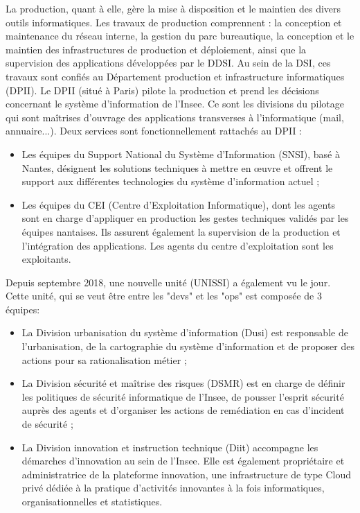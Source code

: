 \documentclass[11pt,fleqn]{book} %
\begin{document}
La production, quant à elle, gère la mise à disposition et le maintien des divers outils informatiques. Les travaux de production comprennent : la conception et maintenance du réseau interne, la gestion du parc bureautique, la conception et le maintien des infrastructures de production et déploiement, ainsi que la supervision des applications développées par le DDSI. Au sein de la DSI, ces travaux sont confiés au Département production et infrastructure informatiques (DPII). Le DPII (situé à Paris) pilote la production et prend les décisions concernant le système d’information de l’Insee. Ce sont les divisions du pilotage qui sont maîtrises d’ouvrage des applications transverses à l’informatique (mail, annuaire...). Deux services sont fonctionnellement rattachés au DPII :
\begin{itemize}
    \item Les équipes du Support National du Système d’Information (SNSI), basé à Nantes, désignent les solutions techniques à mettre en œuvre et offrent le support aux différentes technologies du système d’information actuel ;
    \item Les équipes du CEI (Centre d’Exploitation Informatique), dont les agents sont en charge d’appliquer
en production les gestes techniques validés par les équipes nantaises. Ils assurent également la supervision de la production et l’intégration des applications. Les agents du centre
d’exploitation sont les exploitants.\\
\end{itemize}

Depuis septembre 2018, une nouvelle unité (UNISSI) a également vu le jour. Cette unité, qui se veut être entre les "devs" et les "ops" est composée de 3 équipes: 
\begin{itemize}
    \item La Division urbanisation du système d’information (Dusi) est responsable de l’urbanisation, de la cartographie du système d’information et de proposer des actions pour sa rationalisation métier ;
    \item La Division sécurité et maîtrise des risques (DSMR) est en charge de définir les politiques de sécurité informatique de l’Insee, de pousser l’esprit sécurité auprès des agents et d’organiser les actions de remédiation en cas d’incident de sécurité ;
    \item La Division innovation et instruction technique (Diit) accompagne les démarches d’innovation au sein de l’Insee. Elle est également propriétaire et administratrice de la plateforme innovation, une infrastructure de type Cloud privé dédiée à la pratique d’activités innovantes à la fois informatiques, organisationnelles et statistiques.\\
\end{itemize}
\end{document}
